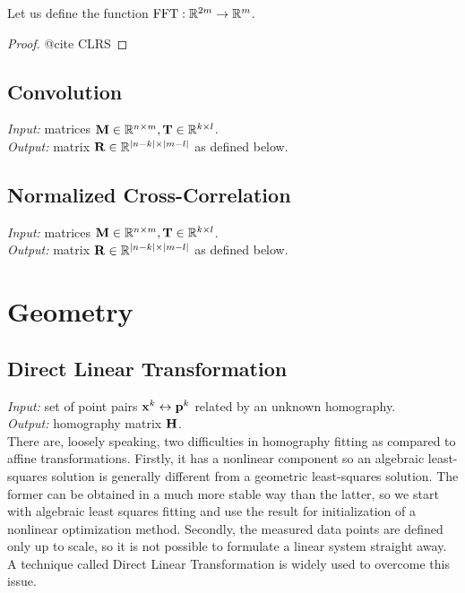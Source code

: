 Let us define the function $\mathrm{FFT}: \mathbb{R}^{2m} \rightarrow \mathbb{R}^m$.

\begin{proof}
@cite CLRS
\end{proof}

\subsection{Convolution}

\textit{Input:} matrices $\mathbf{M} \in \mathbb{R}^{n \times m}, \mathbf{T} \in \mathbb{R}^{k \times l}$.\\
\textit{Output:} matrix $\mathbf{R} \in \mathbb{R}^{|n-k| \times |m - l|}$ as defined below.\\

\subsection{Normalized Cross-Correlation}

\textit{Input:} matrices $\mathbf{M} \in \mathbb{R}^{n \times m}, \mathbf{T} \in \mathbb{R}^{k \times l}$.\\
\textit{Output:} matrix $\mathbf{R} \in \mathbb{R}^{|n-k| \times |m - l|}$ as defined below.\\


\section{Geometry}

\subsection{Direct Linear Transformation}

\textit{Input:} set of point pairs $\mathbf{x}^k \leftrightarrow \mathbf{p}^k$ related by an unknown homography.\\
\textit{Output:} homography matrix $\mathbf{H}$.\\

There are, loosely speaking, two difficulties in homography fitting as compared to affine transformations.
Firstly, it has a nonlinear component so an algebraic least-squares solution is generally different from a geometric least-squares solution.
The former can be obtained in a much more stable way than the latter, so we start with algebraic least squares fitting and use the result for initialization of a nonlinear optimization method.
Secondly, the measured data points are defined only up to scale, so it is not possible to formulate a linear system straight away.
A technique called Direct Linear Transformation is widely used to overcome this issue.

